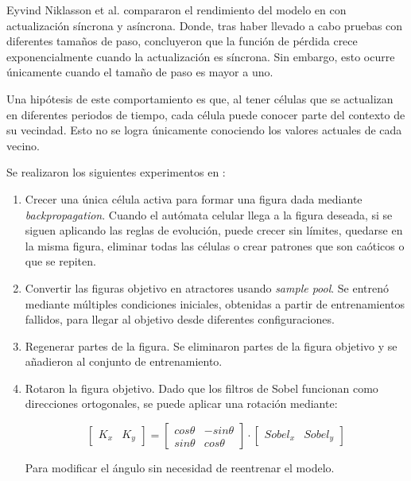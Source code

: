 Eyvind Niklasson et al. \cite{NiklassonNCA} compararon el rendimiento del modelo en \cite{mordvintsevNCA} con actualización síncrona y asíncrona. Donde, tras haber llevado a cabo pruebas con diferentes tamaños de paso, concluyeron que la función de pérdida crece exponencialmente cuando la actualización es síncrona. Sin embargo, esto ocurre únicamente cuando el tamaño de paso es mayor a uno.

Una hipótesis de este comportamiento es que, al tener células que se actualizan en diferentes periodos de tiempo, cada célula puede conocer parte del contexto de su vecindad. Esto no se logra únicamente conociendo los valores actuales de cada vecino.

Se realizaron los siguientes experimentos en \cite{mordvintsevNCA}:

\begin{enumerate}
	
	\item Crecer una única célula activa para formar una figura dada mediante \textit{backpropagation}. Cuando el autómata celular llega a la figura deseada, si se siguen aplicando las reglas de evolución, puede crecer sin límites, quedarse en la misma figura, eliminar todas las células o crear patrones que son caóticos o que se repiten.
	
	
	
	\item Convertir las figuras objetivo en atractores usando \textit{sample pool}. Se entrenó mediante múltiples condiciones iniciales, obtenidas a partir de entrenamientos fallidos, para llegar al objetivo desde diferentes configuraciones. 
	
	
	
	\item Regenerar partes de la figura. Se eliminaron partes de la figura objetivo y se añadieron al conjunto de entrenamiento.
	
	
	
	\item Rotaron la figura objetivo. Dado que los filtros de Sobel funcionan como direcciones ortogonales, se puede aplicar una rotación mediante: 
	
	\[ \begin{bmatrix}
		
		K_x & K_y
		
	\end{bmatrix} = \begin{bmatrix}
		
		cos \theta & -sin \theta \\
		
		sin \theta & cos \theta
		
	\end{bmatrix} \cdot \begin{bmatrix}
		
		Sobel_x & Sobel_y
		
	\end{bmatrix} \]
	
	Para modificar el ángulo sin necesidad de reentrenar el modelo.
	
\end{enumerate}

